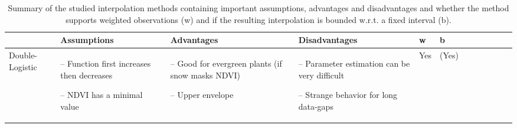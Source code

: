 \begin{table}[!ht]
	\centering
	\caption[skip=10pt]{Summary of the studied interpolation methods containing important assumptions, advantages and disadvantages and whether the method supports weighted observations (w) and if the resulting interpolation is bounded w.r.t. a fixed interval (b).}
	\small
	\begin{tabular}{p{1.6cm}p{3.3cm}p{3.3cm}p{3.4cm}p{0.4cm}p{0.4cm}p{3cm}p{3cm}p{3cm}p{3cm}p{2.7cm}p{3cm}|}
		\toprule
		~                                                                                                                                                            &
		\textbf{Assumptions}                                                                                                                                         &
		\textbf{Advantages}                                                                                                                                                &
		\textbf{Disadvantages}                                                                                                                                                &
		\textbf{w}                                                                                                                                      &
		\textbf{b}                                                                                                                                        \\ \hline

		Double-Logistic                                                                                                                                              &
		\begin{cptitemize} \item[--]  Function first increases then decreases \item[--]  NDVI has a minimal value                            \end{cptitemize}        &
		\begin{cptitemize} \item[--]  Good for evergreen plants (if snow masks NDVI) \item[--]  Upper envelope                                \end{cptitemize}        &
		\begin{cptitemize} \item[--]  Parameter estimation can be very difficult \item[--]  Strange behavior for long data-gaps             \end{cptitemize}        &
		Yes                                                                                                                                                          &
		(Yes)                                                                                                                                                         \\ \hline%


\end{tabular}
\end{table}
